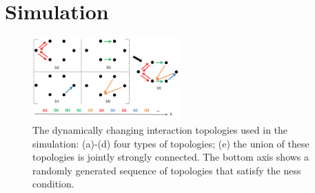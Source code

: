 \section{Simulation}\label{sec:sim}

	\begin{figure}		
		\includegraphics[width=0.5\textwidth]{figures/switch_topo}
		\caption{The dynamically changing interaction topologies used in the simulation: (a)-(d) four types of topologies; (e) the union of these topologies is jointly strongly connected. The bottom axis shows a randomly generated sequence of topologies that satisfy the \fc ness condition.}\label{fig:com_topo}		
	\end{figure}
	
